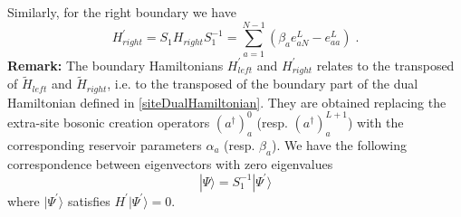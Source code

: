 \documentclass[10pt]{article}
\numberwithin{equation}{section}
\numberwithin{equation}{subsection}
\newcommand{\dt}{\;.}
\begin{document}
Similarly, for the right boundary we have 
\begin{equation}
H_{right}^{'}=S_{1}H_{right}S_{1}^{-1}=
\sum_{a=1}^{N-1}\left(\beta_{a}e_{aN}^{L}-e_{aa}^{L}\right)\dt
\end{equation}
\textbf{Remark:} The boundary Hamiltonians $H_{left}^{'}$ and $H_{right}^{'}$ relates to the transposed of  $\widetilde{H}_{left}$ and $\widetilde{H}_{right}$, i.e. to the transposed of the boundary part of the dual Hamiltonian  defined in \eqref{siteDualHamiltonian}. They are obtained replacing the  extra-site bosonic creation operators $(a^{\dagger})_{a}^{0}$  (resp. $(a^{\dagger})_{a}^{L+1}$) with the corresponding reservoir parameters $\alpha_a$ (resp. $\beta_a$).
\newline\newline
We have the following correspondence between eigenvectors with zero eigenvalues
\begin{equation}\label{S1-Inverse}
	|\Psi\rangle =S_{1}^{-1}|\Psi^{'}\rangle
\end{equation}
where $|\Psi^{'}\rangle$ satisfies $H^{'}|\Psi^{'}\rangle=0$.
\end{document}
